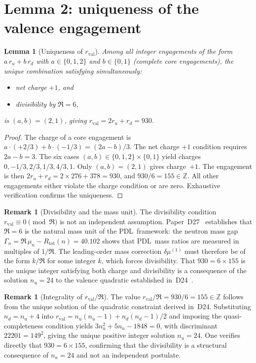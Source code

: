 \documentclass[11pt,a4paper]{article}
\newtheorem{lemma}[theorem]{Lemma}
\theoremstyle{definition}
\newtheorem{remark}[theorem]{Remark}
\newcommand{\PDL}{\textnormal{PDL}}
\newcommand{\Rtot}{R_{\mathrm{tot}}}
\newcommand{\rval}{r_{\mathrm{val}}}
\newcommand{\dmu}{\delta\mu}
\begin{document}
\section{Lemma 2: uniqueness of the valence engagement}
\label{sec:L2}

\begin{lemma}[Uniqueness of $\rval$]
\label{lem:L2}
Among all integer engagements of the form $a\,r_u + b\,r_d$ with $a \in \{0,1,2\}$ and $b \in \{0,1\}$ (complete core engagements), the unique combination satisfying simultaneously:
\begin{itemize}
\item net charge $+1$, and
\item divisibility by $\Re = 6$,
\end{itemize}
is $(a,b) = (2,1)$, giving $\rval = 2r_u + r_d = 930$.
\end{lemma}

\begin{proof}
The charge of a core engagement is $a\cdot(+2/3) + b\cdot(-1/3) = (2a-b)/3$. The net charge $+1$ condition requires $2a - b = 3$. The six cases $(a,b) \in \{0,1,2\}\times\{0,1\}$ yield charges $0, -1/3, 2/3, 1/3, 4/3, 1$. Only $(a,b) = (2,1)$ gives charge~$+1$. The engagement is then $2r_u + r_d = 2\times 276 + 378 = 930$, and $930 / 6 = 155 \in \mathbb{Z}$. All other engagements either violate the charge condition or are zero. Exhaustive verification confirms the uniqueness.
\end{proof}

\begin{remark}[Divisibility and the mass unit]
The divisibility condition $\rval \equiv 0 \pmod{\Re}$ is not an independent assumption. Paper~D27~\cite{PDL_D27_2026} establishes that $\Re = 6$ is the natural mass unit of the \PDL\ framework: the neutron mass gap $\Gamma_n = \Re\,\mu_n - \Rtot(n) = 40.102$ shows that \PDL\ mass ratios are measured in multiples of $1/\Re$. The leading-order mass correction $\dmu^{(1)}$ must therefore be of the form $k/\Re$ for some integer $k$, which forces divisibility. That $930 = 6 \times 155$ is the unique integer satisfying both charge and divisibility is a consequence of the solution $n_u = 24$ to the valence quadratic established in~D24~\cite{Bridge_PDL_2026}.
\end{remark}

\begin{remark}[Integrality of $\rval/\Re$]
The value $\rval/\Re = 930/6 = 155 \in \mathbb{Z}$ follows from the unique solution of the quadratic constraint derived in~D24. Substituting $n_d = n_u + 4$ into $\rval = n_u(n_u-1) + n_d(n_d-1)/2$ and imposing the quasi-completeness condition yields $3n_u^2 + 5n_u - 1848 = 0$, with discriminant $22201 = 149^2$, giving the unique positive integer solution $n_u = 24$. One verifies directly that $930 = 6 \times 155$, confirming that the divisibility is a structural consequence of $n_u = 24$ and not an independent postulate.
\end{remark}
\end{document}
